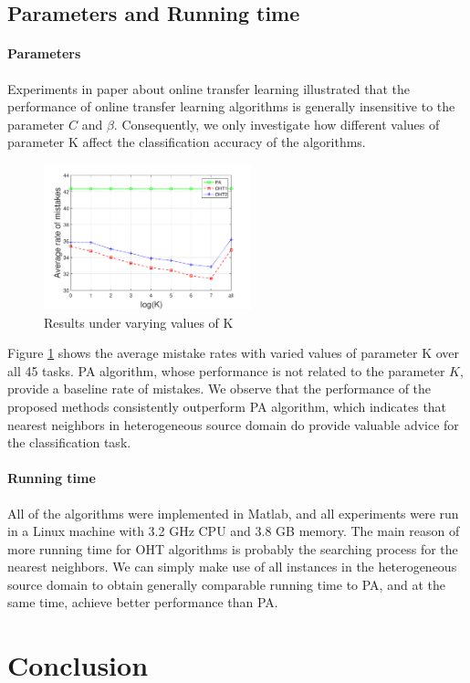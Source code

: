 \documentclass[letterpaper]{article}
\begin{document}
\subsection{Parameters and Running time}
\paragraph{Parameters}
Experiments in paper about online transfer learning illustrated that the performance of online transfer learning algorithms is generally insensitive to the parameter $C$ and $\beta$.
Consequently, we only investigate how different values of parameter K affect the classification accuracy of the algorithms.

\begin{figure}[!htb]
\centering
  \includegraphics[width=6cm]{average.pdf}
  \caption{Results under varying values of K}
  \label{average eok}
\end{figure}

Figure \ref{average eok} shows the average mistake rates with varied values of parameter K over all 45 tasks.
PA algorithm, whose performance is not related to the parameter $K$, provide a baseline rate of mistakes.
We observe that the performance of the proposed methods consistently outperform PA algorithm, which indicates that nearest neighbors in heterogeneous source domain do provide valuable advice for the classification task.

\paragraph{Running time}
All of the algorithms were implemented in Matlab, and all experiments were run in a Linux machine with 3.2 GHz CPU and 3.8 GB memory.
The main reason of more running time for OHT algorithms is probably the searching process for the nearest neighbors.
We can simply make use of all instances in the heterogeneous source domain to obtain generally comparable running time to PA, and at the same time, achieve better performance than PA.

\section{Conclusion}
\end{document}
